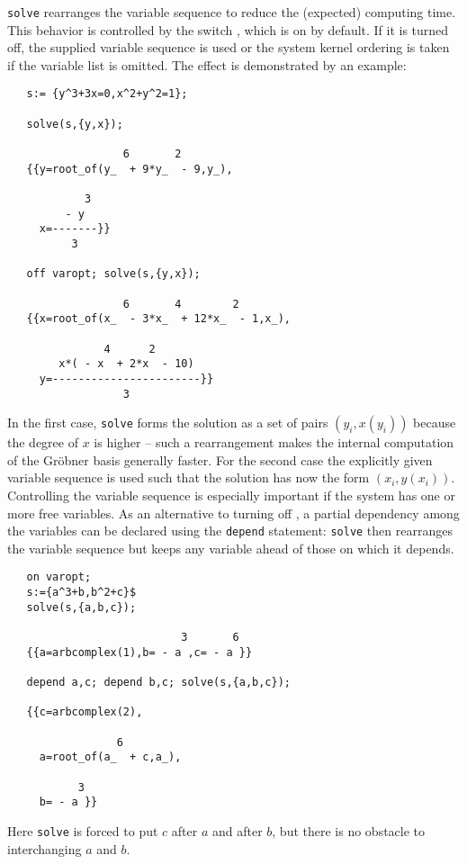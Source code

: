 \hypertarget{switch:VAROPT}{}
\texttt{solve} rearranges the variable sequence
to reduce the (expected) computing time. This behavior is controlled
by the switch , which is on by default.
If it is turned off, the supplied variable sequence is used
or the system kernel ordering is taken if the variable
list is omitted. The effect is demonstrated by an example:
\begin{verbatim}
   s:= {y^3+3x=0,x^2+y^2=1};

   solve(s,{y,x});

                  6       2
   {{y=root_of(y_  + 9*y_  - 9,y_),

            3
         - y
     x=-------}}
          3

   off varopt; solve(s,{y,x});

                  6       4        2
   {{x=root_of(x_  - 3*x_  + 12*x_  - 1,x_),

               4      2
        x*( - x  + 2*x  - 10)
     y=-----------------------}}
                  3

\end{verbatim}
In the first case, \texttt{solve} forms the solution as a set of
pairs $(y_i,x(y_i))$ because the degree of $x$ is higher --
such a rearrangement makes the internal computation of the Gr\"obner basis
generally faster. For the second case the explicitly given variable sequence
is used such that the solution has now the form $(x_i,y(x_i))$.
Controlling the variable sequence is especially important if
the system has one or more free variables.
As an alternative to turning off , a partial dependency among
the variables can be declared using the \texttt{depend}
statement: \texttt{solve} then rearranges the variable sequence but keeps any
variable ahead of those on which it depends.
\begin{verbatim}
   on varopt;
   s:={a^3+b,b^2+c}$
   solve(s,{a,b,c});

                           3       6
   {{a=arbcomplex(1),b= - a ,c= - a }}

   depend a,c; depend b,c; solve(s,{a,b,c});

   {{c=arbcomplex(2),

                 6
     a=root_of(a_  + c,a_),

           3
     b= - a }}
\end{verbatim}
Here \texttt{solve} is forced to put $c$ after $a$ and after $b$, but
there is no obstacle to interchanging $a$ and $b$.
